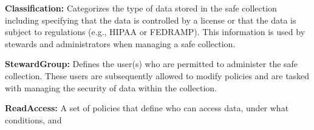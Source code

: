 \textbf{Classification:} Categorizes the type of data stored in the 
safe collection including specifying that the data is controlled by
a license or that the data is subject to regulations (e.g., HIPAA or FEDRAMP).
This information is used by stewards and administrators when 
managing a safe collection.

\textbf{StewardGroup:} Defines the user(s) who are permitted to 
administer the safe collection. These users are subsequently 
allowed to modify policies and are tasked with managing the 
security of data within the collection. 

\textbf{ReadAccess:} A set of policies that define who can
access data, under what conditions, and 


%
%

